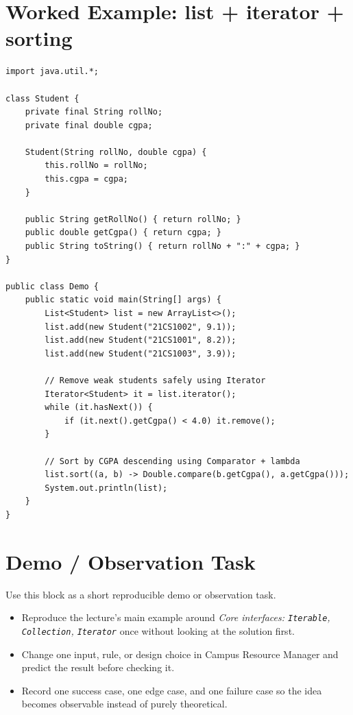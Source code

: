 \documentclass[11pt]{article}
\begin{document}
\section{Worked Example: list + iterator + sorting}
\begin{lstlisting}
import java.util.*;

class Student {
    private final String rollNo;
    private final double cgpa;

    Student(String rollNo, double cgpa) {
        this.rollNo = rollNo;
        this.cgpa = cgpa;
    }

    public String getRollNo() { return rollNo; }
    public double getCgpa() { return cgpa; }
    public String toString() { return rollNo + ":" + cgpa; }
}

public class Demo {
    public static void main(String[] args) {
        List<Student> list = new ArrayList<>();
        list.add(new Student("21CS1002", 9.1));
        list.add(new Student("21CS1001", 8.2));
        list.add(new Student("21CS1003", 3.9));

        // Remove weak students safely using Iterator
        Iterator<Student> it = list.iterator();
        while (it.hasNext()) {
            if (it.next().getCgpa() < 4.0) it.remove();
        }

        // Sort by CGPA descending using Comparator + lambda
        list.sort((a, b) -> Double.compare(b.getCgpa(), a.getCgpa()));
        System.out.println(list);
    }
}
\end{lstlisting}

\section{Demo / Observation Task}
Use this block as a short reproducible demo or observation task.
\begin{itemize}
  \item Reproduce the lecture's main example around \textit{Core interfaces: \texttt{Iterable}, \texttt{Collection}, \texttt{Iterator}} once without looking at the solution first.
  \item Change one input, rule, or design choice in Campus Resource Manager and predict the result before checking it.
  \item Record one success case, one edge case, and one failure case so the idea becomes observable instead of purely theoretical.
\end{itemize}
\notesources{\OOPSUnitVSources}
\end{document}
